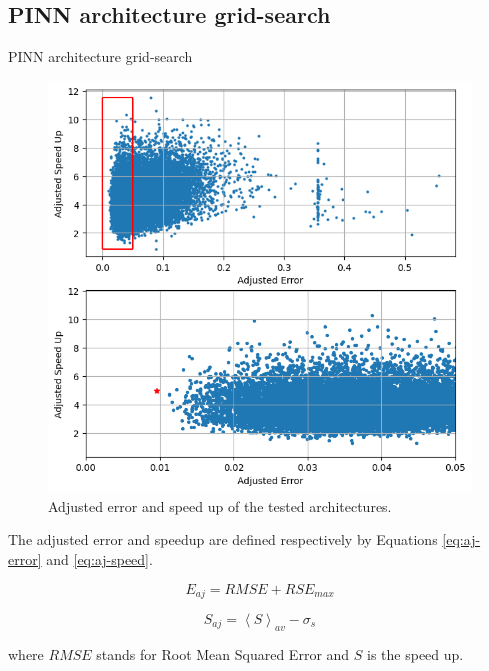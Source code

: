 \documentclass[serif,8pt, aspectratio=169]{beamer}
\begin{document}
    \subsection{PINN architecture grid-search}
    \begin{frame}[fragile]{PINN architecture grid-search}
        \begin{minipage}{0.55\linewidth}
            \begin{figure}
                \centering
                \includegraphics[width=0.85\linewidth]{pic/pinn_selection.png}
                \caption{Adjusted error and speed up of the tested architectures.}
                \label{fig:pinn-selection}
            \end{figure}
        \end{minipage}
        \begin{minipage}{0.4\linewidth}
            The adjusted error and speedup are defined respectively by Equations \ref{eq:aj-error} and \ref{eq:aj-speed}.
    
            \begin{equation}\label{eq:aj-error}
                E_{aj} = RMSE + RSE_{max}
            \end{equation}
    
            \begin{equation}\label{eq:aj-speed}
                S_{aj} = \left< S \right>_{av} - \sigma_s
            \end{equation}
    
            where $RMSE$ stands for Root Mean Squared Error and $S$ is the speed up.
        \end{minipage}
    \end{frame}
    
\end{document}
